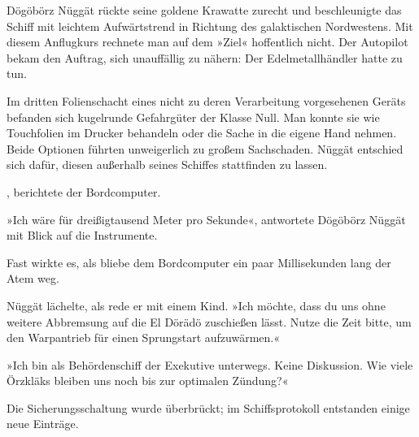 Dögöbörz Nüggät rückte seine goldene Krawatte zurecht und beschleunigte das Schiff mit leichtem Aufwärtstrend in Richtung des galaktischen Nordwestens. Mit diesem Anflugkurs rechnete man auf dem »Ziel« hoffentlich nicht. Der Autopilot bekam den Auftrag, sich unauffällig zu nähern: Der Edelmetallhändler hatte zu tun.

Im dritten Folienschacht eines nicht zu deren Verarbeitung vorgesehenen Geräts befanden sich kugelrunde Gefahrgüter der Klasse Null. Man konnte sie wie Touchfolien im Drucker behandeln oder die Sache in die eigene Hand nehmen. Beide Optionen führten unweigerlich zu großem Sachschaden. Nüggät entschied sich dafür, diesen außerhalb seines Schiffes stattfinden zu lassen.

, berichtete der Bordcomputer. 

»Ich wäre für dreißigtausend Meter pro Sekunde«, antwortete Dögöbörz Nüggät mit Blick auf die Instrumente.

Fast wirkte es, als bliebe dem Bordcomputer ein paar Millisekunden lang der Atem weg. 

Nüggät lächelte, als rede er mit einem Kind. »Ich möchte, dass du uns ohne weitere Abbremsung auf die El Dörädö zuschießen lässt. Nutze die Zeit bitte, um den Warpantrieb für einen Sprungstart aufzuwärmen.«


»Ich bin als Behördenschiff der Exekutive unterwegs. Keine Diskussion. Wie viele Örzkläks bleiben uns noch bis zur optimalen Zündung?«

 Die Sicherungsschaltung wurde überbrückt; im Schiffsprotokoll entstanden einige neue Einträge. 

